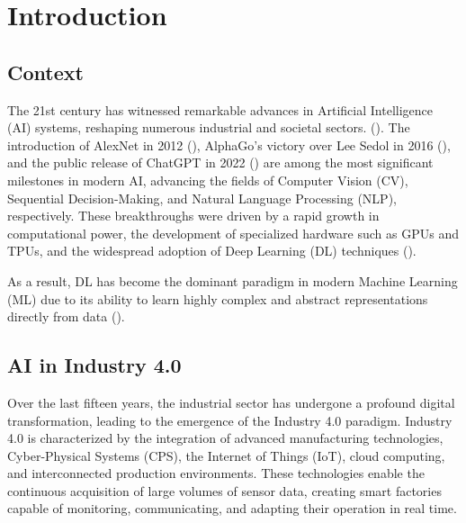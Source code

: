 
\chapter{Introduction} \label{chap:intro}

\section*{}
 

\section{Context} \label{sec:context}

The 21st century has witnessed remarkable advances in Artificial Intelligence (AI) systems, reshaping numerous industrial and societal sectors. (\cite{Golec2025}). 
The introduction of AlexNet in 2012 (\cite{Alex2012}), AlphaGo's victory over Lee Sedol in 2016 (\cite{Silver2016}),
and the public release of ChatGPT in 2022 (\cite{OpenAI2024}) are among the most significant milestones in modern AI,
advancing the fields of Computer Vision (CV), Sequential Decision-Making, and Natural Language
Processing (NLP), respectively. These breakthroughs were driven by a rapid growth in
computational power, the development of specialized hardware such as GPUs and TPUs,
and the widespread adoption of Deep Learning (DL) techniques (\cite{Sajadieh2026}).

As a result, DL has become the dominant paradigm in modern Machine Learning (ML) due to its ability to
learn highly complex and abstract representations directly from data (\cite{Lecun2015}).

\section{AI in Industry 4.0} \label{sec:aiindustry}

Over the last fifteen years, the industrial sector has undergone a profound digital transformation,
leading to the emergence of the Industry 4.0 paradigm. Industry 4.0 is characterized by the integration
of advanced manufacturing technologies, Cyber-Physical Systems (CPS), the Internet of
Things (IoT), cloud computing, and interconnected production environments. These technologies
enable the continuous acquisition of large volumes of sensor data, creating smart factories capable of
monitoring, communicating, and adapting their operation in real time.

